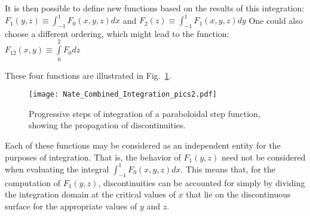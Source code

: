 It is then possible to define new functions based on the results of this integration:
${F_1}\left( {y,z} \right) \equiv \int_{ - 1}^1 {{F_0}\left( {x,y,z} \right)dx} $
and 
${F_2}\left( z \right) \equiv \int_{ - 1}^1 {{F_1}\left( {x,y,z} \right)dy} $
One could also choose a different ordering, which might lead to the function:
$F_{12}\left( {x,y} \right) \equiv \int\limits_0^2 {F_0dz} $

These four functions are illustrated in Fig.~\ref{fig:paraboloidal-integration}.

\begin{figure}[p]
\label{fig:paraboloidal-integration}
\texttt{[image: Nate\_Combined\_Integration\_pics2.pdf]}
\caption{Progressive steps of integration of a paraboloidal step function, showing the propagation of discontinuities.}
\end{figure}

Each of these functions may be considered as an independent entity for the purposes of integration. That is, the behavior of $F_1\left(y,z\right)$ need not be considered when evaluating the integral $\int^1_{-1}F_0\left(x,y,z\right)dx$. This means that, for the computation of $F_1\left(y,z\right)$, discontinuities can be accounted for simply by dividing the integration domain at the critical values of $x$ that lie on the discontinuous surface for the appropriate values of $y$ and $z$. 

